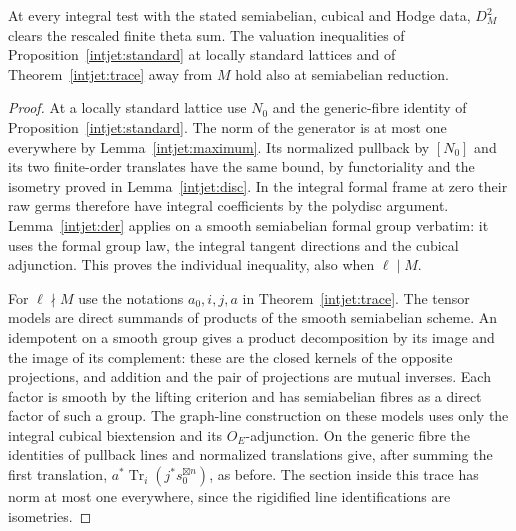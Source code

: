 \begin{theorem}\label{intjet:semi}
At every integral test with the stated semiabelian, cubical and
Hodge data, \(D_M^2\) clears the rescaled finite theta sum. The
valuation inequalities of Proposition~\ref{intjet:standard} at
locally standard lattices and of Theorem~\ref{intjet:trace} away
from \(M\) hold also at semiabelian reduction.
\end{theorem}
\begin{proof}
At a locally standard lattice use \(N_0\) and the generic-fibre
identity of Proposition~\ref{intjet:standard}. The norm of the
generator is at most one everywhere by Lemma~\ref{intjet:maximum}.
Its normalized pullback by \([N_0]\) and its two finite-order
translates have the same bound, by functoriality and the isometry
proved in Lemma~\ref{intjet:disc}. In the integral formal frame
at zero their raw germs therefore have integral coefficients by
the polydisc argument. Lemma~\ref{intjet:der} applies on a smooth
semiabelian formal group verbatim: it uses the formal group law,
the integral tangent directions and the cubical adjunction.
This proves the individual inequality, also when \(\ell\mid M\).

For \(\ell\nmid M\) use the notations \(a_0,i,j,a\) in
Theorem~\ref{intjet:trace}. The tensor models are direct summands
of products of the smooth semiabelian scheme. An idempotent on a
smooth group gives a product decomposition by its image and the
image of its complement: these are the closed kernels of the
opposite projections, and addition and the pair of projections
are mutual inverses. Each factor is smooth by the lifting
criterion and has semiabelian fibres as a direct factor of such a
group. The graph-line construction on these models uses only the
integral cubical biextension and its \(O_E\)-adjunction. On the
generic fibre the identities of pullback lines and normalized
translations give, after summing the first translation,
\(a^*\operatorname{Tr}_i(j^*s_0^{\boxtimes n})\), as before.
The section inside this trace has norm at most one everywhere,
since the rigidified line identifications are isometries.


\end{proof}
